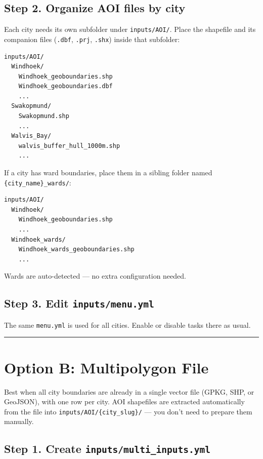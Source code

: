 \documentclass[
  letterpaper,
  DIV=11,
  numbers=noendperiod]{scrreprt}
\begin{document}
\subsection{Step 2. Organize AOI files by
city}\label{step-2.-organize-aoi-files-by-city}

Each city needs its own subfolder under \texttt{inputs/AOI/}. Place the
shapefile and its companion files (\texttt{.dbf}, \texttt{.prj},
\texttt{.shx}) inside that subfolder:

\begin{verbatim}
inputs/AOI/
  Windhoek/
    Windhoek_geoboundaries.shp
    Windhoek_geoboundaries.dbf
    ...
  Swakopmund/
    Swakopmund.shp
    ...
  Walvis_Bay/
    walvis_buffer_hull_1000m.shp
    ...
\end{verbatim}

If a city has ward boundaries, place them in a sibling folder named
\texttt{\{city\_name\}\_wards/}:

\begin{verbatim}
inputs/AOI/
  Windhoek/
    Windhoek_geoboundaries.shp
    ...
  Windhoek_wards/
    Windhoek_wards_geoboundaries.shp
    ...
\end{verbatim}

Wards are auto-detected --- no extra configuration needed.

\subsection{\texorpdfstring{Step 3. Edit
\texttt{inputs/menu.yml}}{Step 3. Edit inputs/menu.yml}}\label{step-3.-edit-inputsmenu.yml}

The same \texttt{menu.yml} is used for all cities. Enable or disable
tasks there as usual.

\begin{center}\rule{0.5\linewidth}{0.5pt}\end{center}

\section{Option B: Multipolygon File}\label{option-b-multipolygon-file}

Best when all city boundaries are already in a single vector file (GPKG,
SHP, or GeoJSON), with one row per city. AOI shapefiles are extracted
automatically from the file into \texttt{inputs/AOI/\{city\_slug\}/} ---
you don't need to prepare them manually.

\subsection{\texorpdfstring{Step 1. Create
\texttt{inputs/multi\_inputs.yml}}{Step 1. Create inputs/multi\_inputs.yml}}\label{step-1.-create-inputsmulti_inputs.yml-1}
\end{document}
